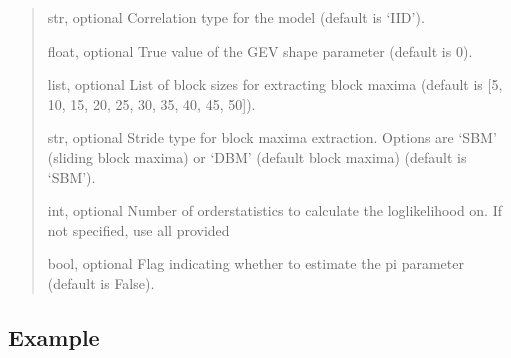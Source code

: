 \documentclass[a4paper,11pt,openany,english]{sphinxmanual}
\begin{document}
\begin{fulllineitems}
\begin{quote}
\begin{description}
\sphinxAtStartPar
str, optional
Correlation type for the model (default is ‘IID’).

\sphinxAtStartPar
float, optional
True value of the GEV shape parameter (default is 0).

\sphinxAtStartPar
list, optional
List of block sizes for extracting block maxima (default is {[}5, 10, 15, 20, 25, 30, 35, 40, 45, 50{]}).

\sphinxAtStartPar
str, optional
Stride type for block maxima extraction. Options are ‘SBM’ (sliding block maxima) or ‘DBM’ (default block maxima) (default is ‘SBM’).

\sphinxAtStartPar
int, optional
Number of orderstatistics to calculate the log\sphinxhyphen{}likelihood on. If not specified, use all provided

\sphinxAtStartPar
bool, optional
Flag indicating whether to estimate the pi parameter (default is False).

\end{description}\end{quote}


\subsection{Example}
\label{\detokenize{api_topt:id92}}
\begin{sphinxVerbatim}[commandchars=\\\{\}]
     \PYG{p}{[}  \PYG{p}{]}   
\end{sphinxVerbatim}



\end{fulllineitems}
\end{document}
